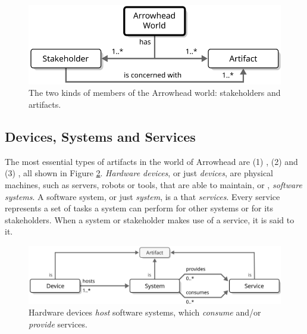 \vfill

\begin{figure}[ht!]
  \centering
  \includegraphics[scale=0.9]{figures/world}
  \caption{
    The two kinds of members of the Arrowhead world: stakeholders and artifacts.
  }
  \label{fig:world}
\end{figure}

\subsection{Devices, Systems and Services}

The most essential types of artifacts in the world of Arrowhead are (1) , (2)  and (3) , all shown in Figure \ref{fig:device-system-service}.
\textit{Hardware devices}, or just \textit{devices}, are physical machines, such as servers, robots or tools, that are able to maintain, or , \textit{software systems}.
A software system, or just \textit{system}, is a   that  \textit{services}.
Every service represents a set of tasks a system can perform for other systems or for its stakeholders.
When a system or stakeholder makes use of a service, it is said to  it.

\vfill

\begin{figure}[ht!]
  \centering
  \includegraphics[scale=0.9]{figures/device-system-service}
  \caption{
    Hardware devices \textit{host} software systems, which \textit{consume} and/or \textit{provide} services.
  }
  \label{fig:device-system-service}
\end{figure}

